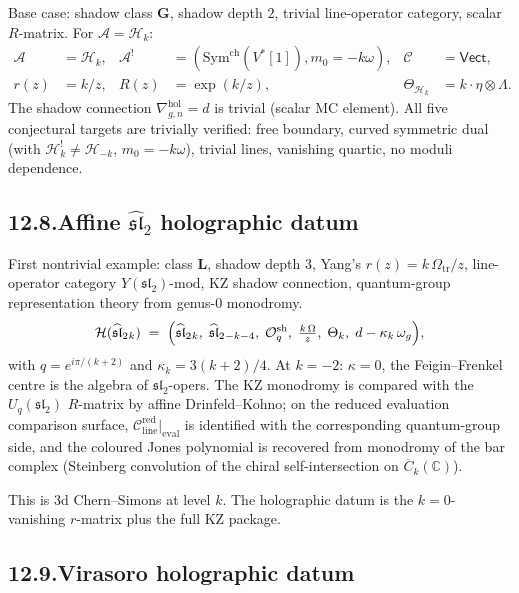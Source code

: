 \documentclass[11pt]{report}
\theoremstyle{definition}
\theoremstyle{remark}
\providecommand{\cA}{\mathcal{A}}
\providecommand{\cC}{\mathcal{C}}
\providecommand{\cH}{\mathcal{H}}
\providecommand{\cO}{\mathcal{O}}
\providecommand{\Sym}{\mathrm{Sym}}
\providecommand{\FM}{\overline{C}}
\providecommand{\hol}{\mathrm{hol}}
\providecommand{\red}{\mathrm{red}}
\providecommand{\bC}{\mathbb{C}}
\providecommand{\ch}{\mathrm{ch}}
\numberwithin{equation}{section}
\begin{document}
Base case: shadow class $\mathbf G$, shadow depth $2$, trivial
line-operator category, scalar $R$-matrix. For $\cA = \cH_k$:
\begin{align*}
\cA &= \cH_k, & \cA^! &= (\Sym^{\ch}(V^*[1]),m_0=-k\omega),
 & \cC &= \mathsf{Vect},\\
r(z) &= k/z, & R(z) &= \exp(k/z),
 & \Theta_{\cH_k} &= k\cdot\eta\otimes\Lambda.
\end{align*}
The shadow connection $\nabla^{\hol}_{g,n} = d$ is trivial
(scalar MC element). All five conjectural targets are
trivially verified: free boundary, curved symmetric dual
(with $\cH_k^! \neq \cH_{-k}$, $m_0 = -k\omega$), trivial
lines, vanishing quartic, no moduli dependence.

\subsection*{12.8.\enspace Affine $\widehat{\mathfrak{sl}}_2$ holographic datum}

First nontrivial example: class $\mathbf L$, shadow depth $3$,
Yang's $r(z) = k\,\Omega_{\mathrm{tr}}/z$, line-operator category
$Y(\mathfrak{sl}_2)\text{-mod}$, KZ shadow connection,
quantum-group representation theory from genus-$0$ monodromy.
\[
\cH(\widehat{\mathfrak{sl}}_2{}_k)
\;=\;
\Bigl(
\widehat{\mathfrak{sl}}_2{}_k,\;
\widehat{\mathfrak{sl}}_2{}_{-k-4},\;
\cO_q^{\mathrm{sh}},\;
\tfrac{k\,\Omega}{z},\;
\Theta_k,\;
d - \kappa_k\,\omega_g
\Bigr),
\]
with $q = e^{i\pi/(k+2)}$ and $\kappa_k = 3(k+2)/4$. At
$k = -2$: $\kappa = 0$, the Feigin--Frenkel centre is the
algebra of $\mathfrak{sl}_2$-opers. The KZ monodromy is
compared with the $U_q(\mathfrak{sl}_2)$ $R$-matrix by affine
Drinfeld--Kohno; on the reduced evaluation comparison surface,
$\cC_{\mathrm{line}}^{\red}|_{\mathrm{eval}}$ is identified
with the corresponding quantum-group side, and the coloured
Jones polynomial is recovered from monodromy of the bar complex
(Steinberg convolution of the chiral self-intersection on
$\FM_k(\bC)$).

This is 3d Chern--Simons at level $k$. The holographic datum
is the $k = 0$-vanishing $r$-matrix plus the full KZ package.

\subsection*{12.9.\enspace Virasoro holographic datum}
\end{document}
